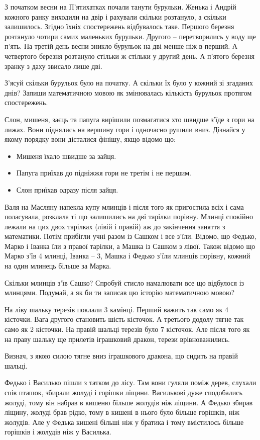 \problem
З початком весни на П'ятихатках почали танути бурульки.
Женька і Андрій кожного ранку виходили на двір і рахували скільки розтануло,
а скільки залишилось.
Згідно їхніх спостережень відбувалось таке.
Першого березня розтануло чотири самих маленьких бурульки.
Другого – перетворились у воду ще п'ять.
На третій день весни зникло бурульок на дві менше ніж в перший.
А четвертого березня розтануло стільки ж стільки у другий день.
А п'ятого березня зранку з даху звисало лише дві.

З'ясуй скільки бурульок було на початку.
А скільки їх було у кожний зі згаданих днів?
Запиши математичною мовою як змінювалась кількість бурульок
протягом спостережень.


\problem
Слон, мишеня, заєць та папуга вирішили позмагатися хто швидше з'їде
з гори на лижах. Вони піднялись на вершину гори і одночасно рушили вниз.
Дізнайся у якому порядку вони дісталися фінішу, якщо відомо що:
\begin{itemize}
    \item Мишеня їхало швидше за зайця.
    \item Папуга приїхав до підніжжя гори не третім і не першим.
    \item Слон приїхав одразу після зайця.
\end{itemize}


\problem
Валя на Масляну напекла купу млинців і після того як пригостила всіх
і сама поласувала, розклала ті що залишились на дві тарілки порівну.
Млинці спокійно лежали на цих двох тарілках (лівій і правій)
аж до закінчення заняття з математики.
Потім прибігли учні разом із Сашком і все з'їли.
Відомо, що Федько, Марко і Іванка їли з правої тарілки,
а Машка із Сашком з лівої.
Також відомо що Марко з'їв 4 млинці, Іванка – 3,
Машка і Федько з'їли млинців порівну, кожний на один млинець більше за Марка.

Скільки млинців з'їв Сашко?
Спробуй стисло намалювати все що відбулося із млинцями.
Подумай, а як би ти записав цю історію математичною мовою?


\problem
На ліву шальку терезів поклали 3 камінці.
Перший важить так само як 4 кісточки.
Вага другого становить шість кісточок.
А третього додолу тягне так само як 2 кісточки.
На правій шальці терезів було 7 кісточок.
Але після того як на праву шальку ще прилетів іграшковий дракон,
терези врівноважились.

Визнач, з якою силою тягне вниз іграшкового дракона,
що сидить на правій шальці.


\problem
Федько і Василько пішли з татком до лісу.
Там вони гуляли поміж дерев, слухали спів пташок,
збирали жолуді і горішки ліщини. 
Василькові дуже сподобались жолуді, тому він набрав в кишеню більше
жолудів ніж ліщини. А Федько збирав ліщину, жолуді брав рідко,
тому в кишені в нього було більше горішків, ніж жолудів. 
Але у Федька кишені більші ніж у братика і тому вмістилось
більше горішків і жолудів ніж у Василька. 


